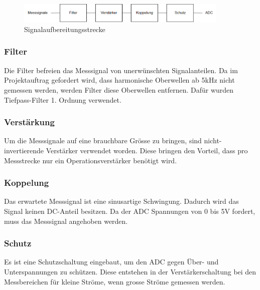 \begin{figure}[H]
\begin{center}
\includegraphics[width=0.9\textwidth]{images/Technische_Grundlagen_Signalaufbereitung.png}
\caption{Signalaufbereitungsstrecke}
\end{center}
\end{figure}

\subsubsection*{Filter}
Die Filter befreien das Messsignal von unerwünschten Signalanteilen. Da im Projektauftrag gefordert wird, dass harmonische Oberwellen ab 5kHz nicht gemessen werden, werden Filter diese Oberwellen entfernen. Dafür wurden Tiefpass-Filter 1. Ordnung verwendet.
\subsubsection*{Verstärkung}
Um die Messsignale auf eine brauchbare Grösse zu bringen, sind nicht-invertierende Verstärker verwendet worden. Diese bringen den Vorteil, dass pro Messstrecke nur ein Operationsverstärker benötigt wird.
\subsubsection*{Koppelung}
Das erwartete Messsignal ist eine sinusartige Schwingung. Dadurch wird das Signal keinen DC-Anteil besitzen. Da der ADC Spannungen von 0 bis 5V fordert, muss das Messsignal angehoben werden.
\subsubsection*{Schutz}
Es ist eine Schutzschaltung eingebaut, um den ADC gegen Über- und Unterspannungen zu schützen. Diese entstehen in der Verstärkerschaltung bei den Messbereichen für kleine Ströme, wenn grosse Ströme gemessen werden.

\pagebreak